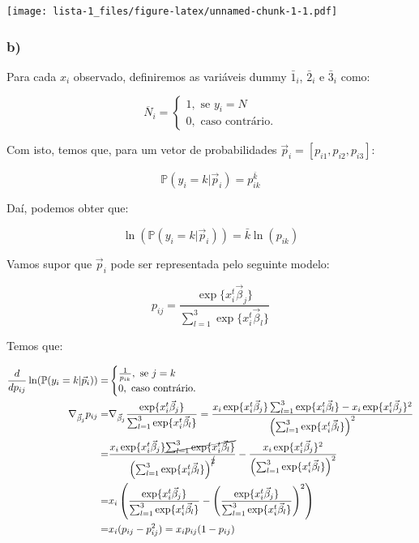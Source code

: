\documentclass[
]{article}
\begin{document}
\texttt{[image: lista-1\_files/figure-latex/unnamed-chunk-1-1.pdf]}

\hypertarget{b-2}{%
\subsubsection{b)}\label{b-2}}

Para cada \(x_i\) observado, definiremos as variáveis dummy
\(\bar{1}_i\), \(\bar{2}_i\) e \(\bar{3}_i\) como:

\[
\overline{N}_i=\begin{cases}
1,\text{ se }y_i=N\\
0,\text{ caso contrário.}
\end{cases}
\]

Com isto, temos que, para um vetor de probabilidades
\(\vec{p}_i=[p_{i1},p_{i2},p_{i3}]\):

\[
\mathbb{P}(y_i=k|\vec{p}_i)=p_{ik}^{\bar{k}}
\]

Daí, podemos obter que:

\[
\ln(\mathbb{P}(y_i=k|\vec{p}_i))=\bar{k}\ln (p_{ik})
\]

Vamos supor que \(\vec{p}_i\) pode ser representada pelo seguinte
modelo:

\[p_{ij}=\frac{\exp\{{x_i^t\vec{\beta}_j}\}}{\sum_{l=1}^{3}\exp\{{x_i^t\vec{\beta}_l}\}}\]

Temos que:

\[
\begin{aligned}
\frac{d}{dp_{ij}}\ln(\mathbb{P}(y_i=k|\vec{p}_i))=&\begin{cases}\frac{1}{p_{ik}}, \text{ se }j=k\\ 0,\text{ caso contrário.}\end{cases}\\
\nabla_{\vec{\beta}_{j}}p_{ij}=&\nabla_{\vec{\beta}_{j}}\frac{\exp\{{x_i^t\vec{\beta}_j}\}}{\sum_{l=1}^{3}\exp\{{x_i^t\vec{\beta}_l}\}}=\frac{x_i\exp\{{x_i^t\vec{\beta}_j}\}\sum_{l=1}^{3}\exp\{{x_i^t\vec{\beta}_l}\}-x_i\exp\{{x_i^t\vec{\beta}_j}\}^2}{\left(\sum_{l=1}^{3}\exp\{{x_i^t\vec{\beta}_l}\}\right)^2}\\
=&\frac{x_i\exp\{{x_i^t\vec{\beta}_j}\}\cancel{\sum_{l=1}^{3}\exp\{{x_i^t\vec{\beta}_l}\}}}{\left(\sum_{l=1}^{3}\exp\{{x_i^t\vec{\beta}_l}\}\right)^{\cancel{2}}}-\frac{x_i\exp\{{x_i^t\vec{\beta}_j}\}^2}{\left(\sum_{l=1}^{3}\exp\{{x_i^t\vec{\beta}_l}\}\right)^2}\\
=&x_i\left(\frac{\exp\{{x_i^t\vec{\beta}_j}\}}{\sum_{l=1}^{3}\exp\{{x_i^t\vec{\beta}_l}\}}-\left(\frac{\exp\{{x_i^t\vec{\beta}_j}\}}{\sum_{l=1}^{3}\exp\{x_i^t\vec{\beta}_l\}}\right)^2\right)\\
=&x_i(p_{ij}-p_{ij}^2)=x_ip_{ij}(1-p_{ij})
\end{aligned}
\]
\end{document}
